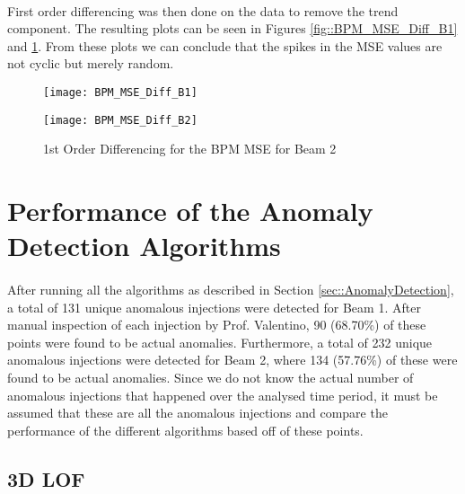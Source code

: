 \paragraph{ }First order differencing was then done on the data to remove the trend component. The resulting plots can be seen in Figures \ref{fig::BPM_MSE_Diff_B1} and \ref{fig::BPM_MSE_Diff_B2}. From these plots we can conclude that the spikes in the \acs{MSE} values are not cyclic but merely random.

\begin{figure}[!t]
	\begin{minipage}[b]{0.475\linewidth}
		\centering
		\texttt{[image: BPM\_MSE\_Diff\_B1]}
		\caption[BPM MSE Differencing B1]{1st Order Differencing for the BPM MSE for Beam 1}
		\label{fig::BPM_MSE_Diff_B1}
	\end{minipage}	
	\hspace{0.25cm}
	\begin{minipage}[b]{0.475\linewidth}
		\centering
		\texttt{[image: BPM\_MSE\_Diff\_B2]}
		\caption[BPM MSE Differencing B2]{1st Order Differencing for the BPM MSE for Beam 2}
		\label{fig::BPM_MSE_Diff_B2}
	\end{minipage}	
\end{figure}

\section{Performance of the Anomaly Detection Algorithms}

\paragraph{ }After running all the algorithms as described in Section \ref{sec::AnomalyDetection}, a total of 131 unique anomalous injections were detected for Beam 1. After manual inspection of each injection by Prof. Valentino, 90 (68.70\%) of these points were found to be actual anomalies. Furthermore, a total of 232 unique anomalous injections were detected for Beam 2, where 134 (57.76\%) of these were found to be actual anomalies. Since we do not know the actual number of anomalous injections that happened over the analysed time period, it must be assumed that these are all the anomalous injections and compare the performance of the different algorithms based off of these points.

\subsection{3D \acs{LOF}}

